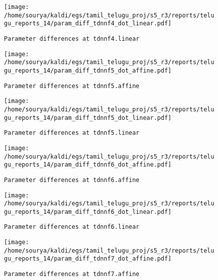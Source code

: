 \documentclass[prl,10pt,twocolumn]{revtex4}
\begin{document}
\newpage
\begin{figure}[h]
  \begin{center}
    \caption{\texttt{Parameter differences at tdnnf4.linear}}
    \texttt{[image: /home/sourya/kaldi/egs/tamil\_telugu\_proj/s5\_r3/reports/telugu\_reports\_14/param\_diff\_tdnnf4\_dot\_linear.pdf]}
  \end{center}
\end{figure}
\clearpage


\newpage
\begin{figure}[h]
  \begin{center}
    \caption{\texttt{Parameter differences at tdnnf5.affine}}
    \texttt{[image: /home/sourya/kaldi/egs/tamil\_telugu\_proj/s5\_r3/reports/telugu\_reports\_14/param\_diff\_tdnnf5\_dot\_affine.pdf]}
  \end{center}
\end{figure}
\clearpage


\newpage
\begin{figure}[h]
  \begin{center}
    \caption{\texttt{Parameter differences at tdnnf5.linear}}
    \texttt{[image: /home/sourya/kaldi/egs/tamil\_telugu\_proj/s5\_r3/reports/telugu\_reports\_14/param\_diff\_tdnnf5\_dot\_linear.pdf]}
  \end{center}
\end{figure}
\clearpage


\newpage
\begin{figure}[h]
  \begin{center}
    \caption{\texttt{Parameter differences at tdnnf6.affine}}
    \texttt{[image: /home/sourya/kaldi/egs/tamil\_telugu\_proj/s5\_r3/reports/telugu\_reports\_14/param\_diff\_tdnnf6\_dot\_affine.pdf]}
  \end{center}
\end{figure}
\clearpage


\newpage
\begin{figure}[h]
  \begin{center}
    \caption{\texttt{Parameter differences at tdnnf6.linear}}
    \texttt{[image: /home/sourya/kaldi/egs/tamil\_telugu\_proj/s5\_r3/reports/telugu\_reports\_14/param\_diff\_tdnnf6\_dot\_linear.pdf]}
  \end{center}
\end{figure}
\clearpage


\newpage
\begin{figure}[h]
  \begin{center}
    \caption{\texttt{Parameter differences at tdnnf7.affine}}
    \texttt{[image: /home/sourya/kaldi/egs/tamil\_telugu\_proj/s5\_r3/reports/telugu\_reports\_14/param\_diff\_tdnnf7\_dot\_affine.pdf]}
  \end{center}
\end{figure}
\clearpage
\end{document}
